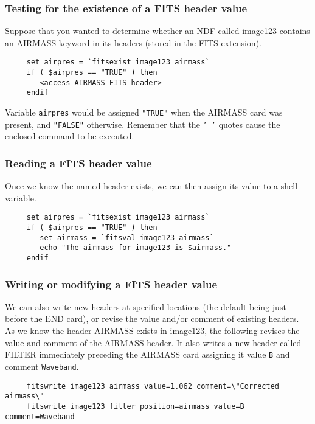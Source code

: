 \subsubsection{Testing for the existence of a FITS header value}

Suppose that you wanted to determine whether an NDF called image123
contains an AIRMASS keyword in its 
headers (stored in the FITS extension).

\small
\begin{verbatim}
     set airpres = `fitsexist image123 airmass`
     if ( $airpres == "TRUE" ) then
        <access AIRMASS FITS header>
     endif
\end{verbatim}
\normalsize
Variable {\tt airpres} would be assigned {\tt "TRUE"} when the AIRMASS
card was present, and {\tt "FALSE"} otherwise.  Remember that the
{\tt `~`} quotes cause the enclosed command to be executed.

\subsubsection{Reading a FITS header value}

Once we know the named header exists, we can then assign its value
to a shell variable.

\small
\begin{verbatim}
     set airpres = `fitsexist image123 airmass`
     if ( $airpres == "TRUE" ) then
        set airmass = `fitsval image123 airmass`
        echo "The airmass for image123 is $airmass."
     endif
\end{verbatim}
\normalsize

\subsubsection{Writing or modifying a FITS header value}

We can also write new headers at specified locations (the default being
just before the END card), or revise the value and/or comment of existing
headers.  As we know the header AIRMASS exists in image123, the
following revises the value and comment of the AIRMASS header.
It also writes a new header called FILTER immediately preceding the
AIRMASS card assigning it value {\tt B} and comment {\tt Waveband}.

\small
\begin{verbatim}
     fitswrite image123 airmass value=1.062 comment=\"Corrected airmass\"
     fitswrite image123 filter position=airmass value=B comment=Waveband
\end{verbatim}
\normalsize

